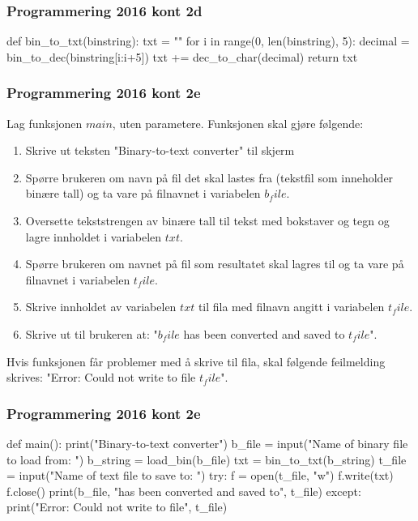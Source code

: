 \begin{frame}[fragile]
    \frametitle{Programmering 2016 kont 2d}

\begin{python}
def bin_to_txt(binstring): 
    txt = ""
    for i in range(0, len(binstring), 5):
        decimal = bin_to_dec(binstring[i:i+5])
        txt    += dec_to_char(decimal)
    return txt
\end{python}

\end{frame}

\begin{frame}[fragile]
    \frametitle{Programmering 2016 kont 2e}

    Lag funksjonen $main$, uten parametere. Funksjonen skal gjøre følgende: 

    \begin{enumerate}
        \item Skrive ut teksten "Binary-to-text converter" til skjerm 
        \item Spørre brukeren om navn på fil det skal lastes fra (tekstfil som inneholder binære tall) og ta vare på filnavnet i variabelen $b_file$. 
        \item Oversette tekststrengen av binære tall til tekst med bokstaver og tegn og lagre innholdet i variabelen $txt$. 
        \item Spørre brukeren om navnet på fil som resultatet skal lagres til og ta vare på filnavnet i variabelen $t_file$. 
        \item Skrive innholdet av variabelen $txt$ til fila med filnavn angitt i variabelen $t_file$. 
        \item Skrive ut til brukeren at: "$b_file$ has been converted and saved to $t_file$".
    \end{enumerate}

    Hvis funksjonen får problemer med å skrive til fila, skal følgende feilmelding skrives: "Error: Could not write to file $t_file$". 

\end{frame}

\begin{frame}[fragile]
    \frametitle{Programmering 2016 kont 2e}

\begin{python}
def main():
    print("Binary-to-text converter")
    b_file      = input("Name of binary file to load from: ")
    b_string    = load_bin(b_file)
    txt         = bin_to_txt(b_string)
    t_file      = input("Name of text file to save to: ")
    try:
        f = open(t_file, "w")
        f.write(txt)
        f.close()
        print(b_file, "has been converted and saved to", t_file)
    except:
        print("Error: Could not write to file", t_file)
\end{python}

\end{frame}


